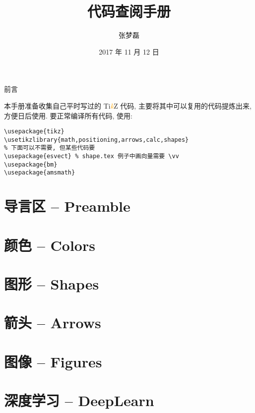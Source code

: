 \documentclass[a4paper, 12pt]{article}
\title{\tikzlogo 代码查阅手册}
\author{张梦磊}
\date{2017 年 11 月 12 日}
\newcommand{\tikzlogo}{Ti\textcolor{orange}{\emph{k}}Z\xspace}
\begin{document}
\maketitle
\begin{minipage}{.9\textwidth}
\centerline{前言}
本手册准备收集自己平时写过的 \tikzlogo 代码, 主要将其中可以复用的代码提炼出来, 方便日后使用. 要正常编译所有代码, 使用:

\begin{verbatim}
\usepackage{tikz}
\usetikzlibrary{math,positioning,arrows,calc,shapes}
% 下面可以不需要, 但某些代码要
\usepackage{esvect} % shape.tex 例子中画向量需要 \vv
\usepackage{bm}
\usepackage{amsmath}
\end{verbatim}
\end{minipage}
\tableofcontents
\section{导言区 -- Preamble}


\section{颜色 -- Colors}

\section{图形 -- Shapes}

\section{箭头 -- Arrows}

\section{图像 -- Figures}

\section{深度学习 -- DeepLearn}
\label{sec:deeplearn}

	
	
	
\end{document}
